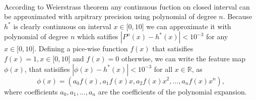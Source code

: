 \documentclass[article,11pt]{article}
\begin{document}
\\
According to Weierstrass theorem any continuous fuction on closed interval can
be approximated with arpitrary precision using polynomial of degree $n$. Because
$h^*$ is clearly continuous on interval $x\in\lbrack 0,10\rbrack$ we can
approximate it with polynomial of degree $n$ which satifies
$|P^n(x)-h^*(x)|<\mathrm{10^{-3}}$ for any $x\in\lbrack 0,10\rbrack$. Defining a pice-wise function $f(x)$ that
satisifies $f(x)=1, x \in\lbrack 0,10\rbrack$ and $f(x)=0$ otherwise, we can
write the feature map $\phi(x)$, that satisifies  $|\phi(x)-h^*(x)|<\mathrm{10^{-3}}$ for all
$x \in \mathbb{R}$, as
\begin{equation}
  \phi(x)=(a_0f(x),a_1f(x)x,a_2f(x)x^2,\ldots,a_nf(x)x^n),
  \label{eq:feature_map}
\end{equation}
where coefficients $a_0, a_1,\ldots, a_n$ are the coefficients of the polynomial
expansion.
\end{document}
